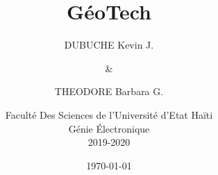 \documentclass[a4paper,12pt]{report}
\begin{document}


\title{\textbf{\huge{GéoTech}}}
\author{
  DUBUCHE Kevin J.

  \and
  \&
  \and
  THEODORE Barbara G.
  \and
  Faculté Des Sciences de l'Université d'Etat Haïti \\ 
   Génie Électronique \\
   2019-2020
}
\date{\today}

\maketitle


\tableofcontents
\newpage
{}
























\end{document}
